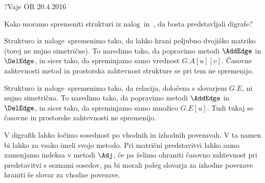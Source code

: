 \begin{naloga}{?}{Vaje OR 20.4.2016}
\begin{vprasanje}
Kako moramo spremeniti strukturi
iz nalog~\nal[matgraf] in~\nal[sosgraf],
da bosta predstavljali digrafe?
\end{vprasanje}

\begin{odgovor}
Strukturo iz naloge~\res[matgraf] spremenimo tako,
da lahko hrani poljubno dvojiško matriko (torej ne nujno simetrične).
To naredimo tako, da popravimo metodi $\AddEdge$ in $\DelEdge$,
in sicer tako, da spreminjamo samo vrednost $G.A[u][v]$.
Časovne zahtevnosti metod in prostorska zahtevnost strukture
se pri tem ne spremenijo.

Strukturo iz naloge~\res[matgraf] spremenimo tako,
da relacija, določena s slo\-va\-rjem $G.E$, ni nujno simetrična.
To naredimo tako, da popravimo metodi $\AddEdge$ in $\DelEdge$,
in sicer tako, da spreminjamo samo množico $G.E[u]$.
Tudi tukaj se časovne in prostorske zahtevnosti ne spremenijo.

V digrafih lahko ločimo sosednost po vhodnih in izhodnih povezavah.
V ta namen bi lahko za vsako imeli svojo metodo.
Pri matrični predstavitvi lahko samo zamenjamo indeksa v metodi $\Adj$,
če pa želimo ohraniti časovno zahtevnost pri predstavitvi s seznami sosedov,
pa bi morali poleg slovarja za izhodne povezave
hraniti še slovar za vhodne povezave.
\end{odgovor}
\end{naloga}
